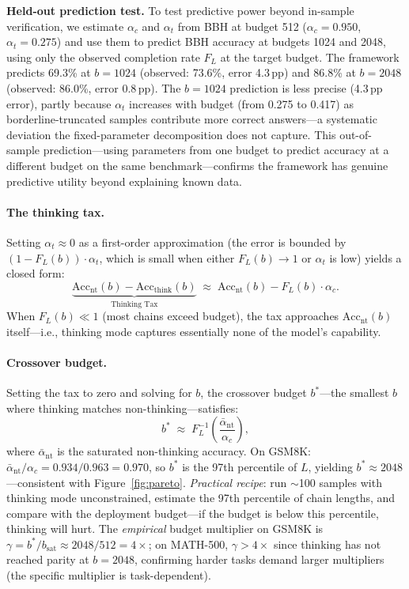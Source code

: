 \noindent\textbf{Held-out prediction test.}
To test predictive power beyond in-sample verification, we estimate $\alpha_c$ and $\alpha_t$ from BBH at budget 512 ($\alpha_c{=}0.950$, $\alpha_t{=}0.275$) and use them to predict BBH accuracy at budgets 1024 and 2048, using only the observed completion rate $F_L$ at the target budget.
The framework predicts 69.3\% at $b{=}1024$ (observed: 73.6\%, error 4.3\,pp) and 86.8\% at $b{=}2048$ (observed: 86.0\%, error 0.8\,pp).
The $b{=}1024$ prediction is less precise (4.3\,pp error), partly because $\alpha_t$ increases with budget (from 0.275 to 0.417) as borderline-truncated samples contribute more correct answers---a systematic deviation the fixed-parameter decomposition does not capture.
This out-of-sample prediction---using parameters from one budget to predict accuracy at a different budget on the same benchmark---confirms the framework has genuine predictive utility beyond explaining known data.

\paragraph{The thinking tax.}
\label{thm:thinking-tax}
Setting $\alpha_t \approx 0$ as a first-order approximation (the error is bounded by $(1{-}F_L(b))\cdot\alpha_t$, which is small when either $F_L(b) \to 1$ or $\alpha_t$ is low) yields a closed form:
\begin{equation}
  \underbrace{\mathrm{Acc}_{\mathrm{nt}}(b)
    - \mathrm{Acc}_{\mathrm{think}}(b)}_{\text{Thinking Tax}}
  \;\approx\;
  \mathrm{Acc}_{\mathrm{nt}}(b) - F_L(b) \cdot \alpha_c.
  \label{eq:tax}
\end{equation}
When $F_L(b) \ll 1$ (most chains exceed budget), the tax approaches $\mathrm{Acc}_{\mathrm{nt}}(b)$ itself---i.e., thinking mode captures essentially none of the model's capability.

\paragraph{Crossover budget.}
\label{prop:crossover}
Setting the tax to zero and solving for $b$, the crossover budget $b^*$---the smallest $b$ where thinking matches non-thinking---satisfies:
\begin{equation}
  b^* \;\approx\; F_L^{-1}\!\!\left(
    \frac{\bar{\alpha}_{\mathrm{nt}}}{\alpha_c}\right),
  \label{eq:crossover}
\end{equation}
where $\bar{\alpha}_{\mathrm{nt}}$ is the saturated non-thinking accuracy.
On GSM8K: $\bar{\alpha}_{\mathrm{nt}}/\alpha_c = 0.934/0.963 = 0.970$, so $b^*$ is the 97th percentile of $L$, yielding $b^* \approx 2048$---consistent with Figure~\ref{fig:pareto}.
\emph{Practical recipe}: run ${\sim}$100 samples with thinking mode unconstrained, estimate the 97th percentile of chain lengths, and compare with the deployment budget---if the budget is below this percentile, thinking will hurt.
The \emph{empirical} budget multiplier on GSM8K is $\gamma = b^*/b_{\mathrm{sat}} \approx 2048/512 = 4\times$; on MATH-500, $\gamma > 4\times$ since thinking has not reached parity at $b{=}2048$, confirming harder tasks demand larger multipliers (the specific multiplier is task-dependent).

